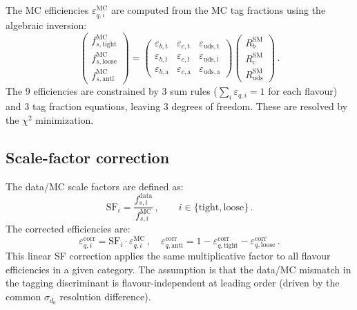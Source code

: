 \documentclass[11pt,a4paper]{article}
\begin{document}
The MC efficiencies $\varepsilon_{q,i}^\mathrm{MC}$ are computed from
the MC tag fractions using the algebraic inversion:
\begin{equation}
  \begin{pmatrix} f_{s,\mathrm{tight}}^\mathrm{MC} \\
    f_{s,\mathrm{loose}}^\mathrm{MC} \\
    f_{s,\mathrm{anti}}^\mathrm{MC} \end{pmatrix}
  = \begin{pmatrix}
    \varepsilon_{b,\mathrm{t}} & \varepsilon_{c,\mathrm{t}} &
      \varepsilon_{\mathrm{uds},\mathrm{t}} \\
    \varepsilon_{b,\mathrm{l}} & \varepsilon_{c,\mathrm{l}} &
      \varepsilon_{\mathrm{uds},\mathrm{l}} \\
    \varepsilon_{b,\mathrm{a}} & \varepsilon_{c,\mathrm{a}} &
      \varepsilon_{\mathrm{uds},\mathrm{a}}
  \end{pmatrix}
  \begin{pmatrix} R_b^\mathrm{SM} \\ R_c^\mathrm{SM} \\
    R_\mathrm{uds}^\mathrm{SM} \end{pmatrix}\,.
  \label{eq:eff-matrix}
\end{equation}
The 9 efficiencies are constrained by 3 sum rules
($\sum_i \varepsilon_{q,i} = 1$ for each flavour) and 3 tag fraction
equations, leaving 3 degrees of freedom.  These are resolved by
the $\chi^2$ minimization.

\subsection{Scale-factor correction}

The data/MC scale factors are defined as:
\begin{equation}
  \mathrm{SF}_i = \frac{f_{s,i}^\mathrm{data}}{f_{s,i}^\mathrm{MC}}\,,
  \qquad i \in \{\mathrm{tight}, \mathrm{loose}\}\,.
  \label{eq:sf-def}
\end{equation}
The corrected efficiencies are:
\begin{equation}
  \varepsilon_{q,i}^\mathrm{corr} = \mathrm{SF}_i \cdot
    \varepsilon_{q,i}^\mathrm{MC}\,, \quad
  \varepsilon_{q,\mathrm{anti}}^\mathrm{corr} = 1 -
    \varepsilon_{q,\mathrm{tight}}^\mathrm{corr} -
    \varepsilon_{q,\mathrm{loose}}^\mathrm{corr}\,.
  \label{eq:eff-corr}
\end{equation}
This linear SF correction applies the same multiplicative factor to
all flavour efficiencies in a given category.  The assumption is that
the data/MC mismatch in the tagging discriminant is flavour-independent
at leading order (driven by the common $\sigma_{d_0}$ resolution difference).
\end{document}

